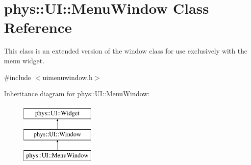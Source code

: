\hypertarget{classphys_1_1UI_1_1MenuWindow}{
\section{phys::UI::MenuWindow Class Reference}
\label{d4/d07/classphys_1_1UI_1_1MenuWindow}
}


This class is an extended version of the window class for use exclusively with the menu widget.  




{\ttfamily \#include $<$uimenuwindow.h$>$}

Inheritance diagram for phys::UI::MenuWindow:\begin{figure}[H]
\begin{center}
\leavevmode
\includegraphics[height=3.000000cm]{d4/d07/classphys_1_1UI_1_1MenuWindow}
\end{center}
\end{figure}
